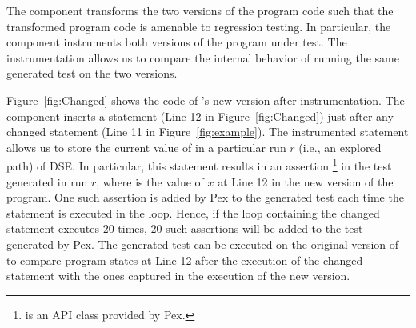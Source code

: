 
The  component transforms the two versions of the
program code such that the transformed program code is
amenable to regression testing. In particular, the  component
instruments both versions of the program under test. The
instrumentation allows us to compare the internal behavior
of running the same generated test on the two versions.
	
	Figure~\ref{fig:Changed} shows the code of 's new version after instrumentation. The  component inserts a statement (Line 12 in Figure~\ref{fig:Changed}) just after any changed	 statement (Line 11 in Figure~\ref{fig:example}). The instrumented statement allows us to store the current value of  in a particular run $r$ (i.e., an explored path) of DSE. In particular, this statement results in an assertion \footnote{\scriptsize{ is an API class provided by Pex.}} in the test generated in run $r$, where  is the value of $x$ at Line 12 in the new version of the program. One such assertion is added by Pex to the generated test each time the statement is executed in the loop. Hence, if the loop containing the changed statement executes 20 times, 20 such assertions will be added to the test generated by Pex.
The generated test can be executed on the original version of  to compare program states at Line 12 after the execution of the changed statement with the ones captured in the execution of the new version. 
			
